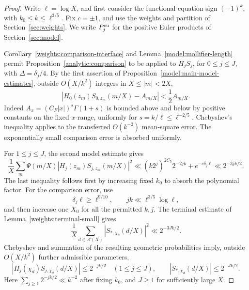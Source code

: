 \begin{proof}
Write \(\ell=\log X\), and first consider the functional-equation sign
\((-1)^k\), with \(k_0\le k\le\ell^{3/5}\).
Fix \(c=\pm1\), and use the weights and partition of
Section~\ref{sec:weights}. We write \(P_j^{\rm eu}\) for the positive
Euler products of Section~\ref{sec:model}.

Corollary~\ref{weights:comparison-interface} and
Lemma~\ref{model:mollifier-length} permit
Proposition~\ref{analytic:comparison} to be applied to \(H_jS_j\),
for \(0\le j\le J\), with \(\Delta=\delta_j/4\).
By the first assertion of Proposition~\ref{model:main-model-estimates},
outside \(O(X/k^2)\) integers in \(X\le|m|<2X\),
\begin{equation}\label{eq:tail-main-good}
 |H_0(z_m)S_{0,z_m}(m/X)-A_{m/X}|<\frac12 A_{m/X}.
\end{equation}
Indeed \(A_x=(C_F|x|)^s\Gamma(1+s)\) is bounded above and below by positive
constants on the fixed \(x\)-range, uniformly for \(s=k/\ell\le\ell^{-2/5}\).
Chebyshev's inequality applies to the transferred \(O(k^{-2})\)
mean-square error. The exponentially small comparison error is absorbed
uniformly.

For \(1\le j\le J\), the second model estimate gives
\[
 \frac1X\sum_m\Psi(m/X)|H_j(z_m)S_{j,z_m}(m/X)|^2
 \ll (k2^j)^{2C_5}2^{-2jk}+e^{-c\delta_j\ell}
 \ll 2^{-3jk/2}.
\]
The last inequality follows first by increasing fixed \(k_0\) to absorb
the polynomial factor. For the comparison error, use
\[
 \delta_j\ell\ge\ell^{9/10},\qquad
 jk\ll\ell^{3/5}\log\ell,
\]
and then increase one \(X_0\) for all the permitted \(k,j\).
The terminal estimate of Lemma~\ref{weights:terminal-small} gives
\[
 \frac1X\sum_{d\in\mathcal A(X)}
       |S_{*,\chi_d}(d/X)|^2\ll 2^{-3Jk/2}.
\]
Chebyshev and summation of the resulting geometric probabilities imply,
outside \(O(X/k^2)\) further admissible parameters,
\begin{equation}\label{eq:tail-other-good}
 |H_j(\chi_d)S_{j,\chi_d}(d/X)|\le2^{-jk/2}\quad(1\le j\le J),
 \qquad
 |S_{*,\chi_d}(d/X)|\le2^{-Jk/2}.
\end{equation}
Here \(\sum_{j\ge1}2^{-jk/2}\ll k^{-2}\) after fixing \(k_0\), and \(J\ge1\)
for sufficiently large \(X\).


\end{proof}
